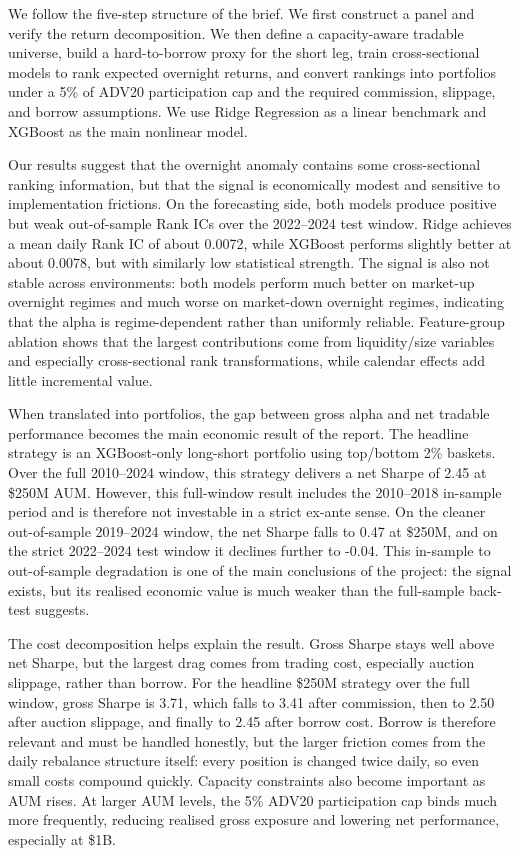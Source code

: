 \documentclass[12pt]{article}
\begin{document}
We follow the five-step structure of the brief. We first construct a panel and verify the return decomposition. We then define a capacity-aware tradable universe, build a hard-to-borrow proxy for the short leg, train cross-sectional models to rank expected overnight returns, and convert rankings into portfolios under a 5\% of ADV20 participation cap and the required commission, slippage, and borrow assumptions. We use Ridge Regression as a linear benchmark and XGBoost as the main nonlinear model.

Our results suggest that the overnight anomaly contains some cross-sectional ranking information, but that the signal is economically modest and sensitive to implementation frictions. On the forecasting side, both models produce positive but weak out-of-sample Rank ICs over the 2022--2024 test window. Ridge achieves a mean daily Rank IC of about 0.0072, while XGBoost performs slightly better at about 0.0078, but with similarly low statistical strength. The signal is also not stable across environments: both models perform much better on market-up overnight regimes and much worse on market-down overnight regimes, indicating that the alpha is regime-dependent rather than uniformly reliable. Feature-group ablation shows that the largest contributions come from liquidity/size variables and especially cross-sectional rank transformations, while calendar effects add little incremental value.

When translated into portfolios, the gap between gross alpha and net tradable performance becomes the main economic result of the report. The headline strategy is an XGBoost-only long-short portfolio using top/bottom 2\% baskets. Over the full 2010--2024 window, this strategy delivers a net Sharpe of 2.45 at \$250M AUM. However, this full-window result includes the 2010--2018 in-sample period and is therefore not investable in a strict ex-ante sense. On the cleaner out-of-sample 2019--2024 window, the net Sharpe falls to 0.47 at \$250M, and on the strict 2022--2024 test window it declines further to -0.04. This in-sample to out-of-sample degradation is one of the main conclusions of the project: the signal exists, but its realised economic value is much weaker than the full-sample back-test suggests.

The cost decomposition helps explain the result. Gross Sharpe stays well above net Sharpe, but the largest drag comes from trading cost, especially auction slippage, rather than borrow. For the headline \$250M strategy over the full window, gross Sharpe is 3.71, which falls to 3.41 after commission, then to 2.50 after auction slippage, and finally to 2.45 after borrow cost. Borrow is therefore relevant and must be handled honestly, but the larger friction comes from the daily rebalance structure itself: every position is changed twice daily, so even small costs compound quickly. Capacity constraints also become important as AUM rises. At larger AUM levels, the 5\% ADV20 participation cap binds much more frequently, reducing realised gross exposure and lowering net performance, especially at \$1B.
\end{document}
